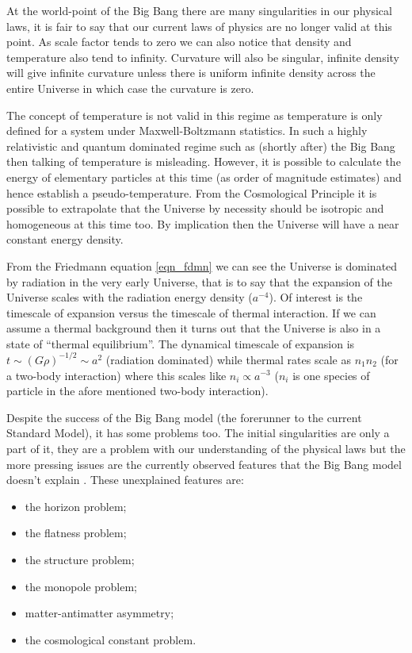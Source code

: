 At the world-point of the Big Bang there are many singularities in our physical laws, it is fair to say that our current laws of physics are no longer valid at this point. As scale factor tends to zero we can also notice that density and temperature also tend to infinity. Curvature will also be singular, infinite density will give infinite curvature unless there is uniform infinite density across the entire Universe in which case the curvature is zero.

The concept of temperature is not valid in this regime as temperature is only defined for a system under Maxwell-Boltzmann statistics. In such a highly relativistic and quantum dominated regime such as (shortly after) the Big Bang then talking of temperature is misleading. However, it is possible to calculate the energy of elementary particles at this time (as order of magnitude estimates) and hence establish a pseudo-temperature. From the Cosmological Principle it is possible to extrapolate that the Universe by necessity should be isotropic and homogeneous at this time too. By implication then the Universe will have a near constant energy density.

From the Friedmann equation \ref{eqn_fdmn} we can see the Universe is dominated by radiation in the very early Universe, that is to say that the expansion of the Universe scales with the radiation energy density ($a^{-4}$). Of interest is the timescale of expansion versus the timescale of thermal interaction. If we can assume a thermal background then it turns out that the Universe is also in a state of ``thermal equilibrium''. The dynamical timescale of expansion is $ t \sim (G\rho)^{-1/2} \sim a^2$ (radiation dominated) while thermal rates scale as $n_1 n_2$ (for a two-body interaction) where this scales like $n_i \propto a^{-3}$ ($n_i$ is one species of particle in the afore mentioned two-body interaction).

Despite the success of the Big Bang model (the forerunner to the current Standard Model), it has some problems too. The initial singularities are only a part of it, they are a problem with our understanding of the physical laws but the more pressing issues are the currently observed features that the Big Bang model doesn't explain \citep{bib_pea, bib_baum}. These unexplained features are:

\begin{itemize}
\item the horizon problem;
\item the flatness problem;
\item the structure problem;
\item the monopole problem;
\item matter-antimatter asymmetry;
\item the cosmological constant problem.
\end{itemize}

